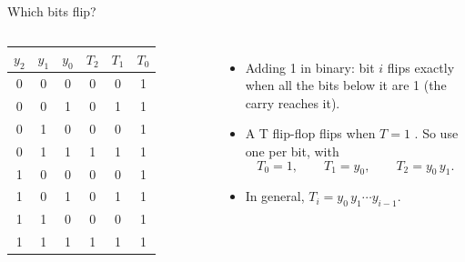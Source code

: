 \documentclass[10pt]{wosm-slides}
\begin{document}
\begin{frame}{Which bits flip?}
  \begin{columns}[c, totalwidth=\textwidth]
      \centering
      \begin{tabular}{@{}ccc|ccc@{}}
        $y_2$ & $y_1$ & $y_0$ & $T_2$ & $T_1$ & $T_0$ \\
        \midrule
        0 & 0 & 0 & 0 & 0 & 1 \\
        0 & 0 & 1 & 0 & 1 & 1 \\
        0 & 1 & 0 & 0 & 0 & 1 \\
        0 & 1 & 1 & 1 & 1 & 1 \\
        1 & 0 & 0 & 0 & 0 & 1 \\
        1 & 0 & 1 & 0 & 1 & 1 \\
        1 & 1 & 0 & 0 & 0 & 1 \\
        1 & 1 & 1 & 1 & 1 & 1 \\
      \end{tabular}\par\smallskip
      \begin{itemize}
        \item Adding 1 in binary: bit $i$ flips exactly when all the bits below it
          are 1 (the carry reaches it).
        \item A T flip-flop flips when $T = 1$ . So use one per bit,
          with
          \[ T_0 = 1, \qquad T_1 = y_0, \qquad T_2 = y_0\, y_1. \]
        \item In general, $T_i = y_0\, y_1 \cdots y_{i-1}$.
      \end{itemize}
  \end{columns}
\end{frame}
\end{document}

